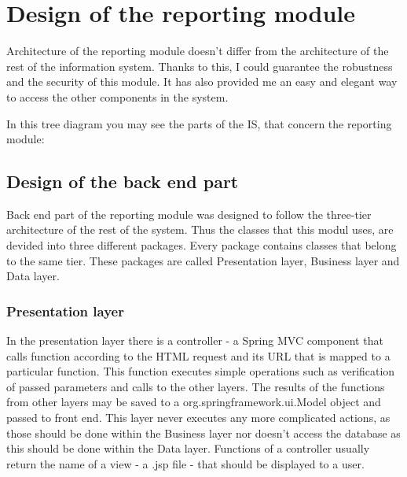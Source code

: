 \documentclass[thesis=B,english]{FITthesis}[2012/10/20]
\begin{document}
\section{Design of the reporting module}
Architecture of the reporting module doesn't differ from the architecture of the rest of the information system. Thanks to this, I could guarantee the robustness and the security of this module. It has also provided me an easy and elegant way to access the other components in the system.

In this tree diagram you may see the parts of the IS, that concern the reporting module:



\subsection{Design of the back end part}
Back end part of the reporting module was designed to follow the three-tier architecture of the rest of the system. Thus the classes that this modul uses, are devided into three different packages. Every package contains classes that belong to the same tier. These packages are called Presentation layer, Business layer and Data layer. 

\subsubsection{Presentation layer}
In the presentation layer there is a controller - a Spring MVC component that calls function according to the HTML request and its URL that is mapped to a particular function. This function executes simple operations such as verification of passed parameters and calls to the other layers. The results of the functions from other layers may be saved to a org.springframework.ui.Model object and passed to front end. This layer never executes any more complicated actions, as those should be done within the Business layer nor doesn't access the database as this should be done within the Data layer. Functions of a controller usually return the name of a view - a .jsp file - that should be displayed to a user.
\end{document}

